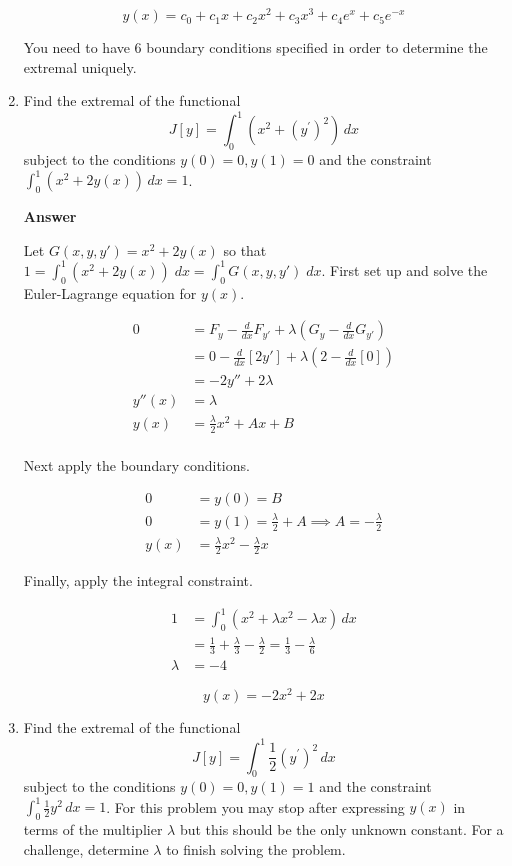 \documentclass[12pt]{article}
\begin{document}
\begin{enumerate}
$$\boxed{ y(x) = c_0 + c_1x +c_2x^2 + c_3x^3 + c_4e^x + c_5e^{-x}}$$

You need to have 6 boundary conditions specified in order to determine the extremal uniquely.

\newpage

\item Find the extremal of the functional
$$
J[y] = \int_0^1 \left( x^2 + (y^{\prime})^2 \right) \,dx
$$
subject to the conditions $y(0) = 0, y(1) = 0$ and the constraint $\int_0^1 \left( x^2 + 2 y(x) \right)\,dx = 1$.

{\bf Answer}

Let $G(x,y,y') = x^2 + 2y(x)$ so that $1 = \int_0^1 \left( x^2 +2y(x)\right) \; dx = \int_0^1 G(x,y,y') \; dx$. First set up and solve the Euler-Lagrange equation for $y(x)$. 

\begin{align*}
0 &= F_y - \frac{d}{dx}F_{y'} + \lambda (G_y - \frac{d}{dx}G_{y'}) \\
&= 0 - \frac{d}{dx}[2y'] + \lambda (2 - \frac{d}{dx}[0]) \\
&= -2y''  + 2\lambda \\
y''(x) &= \lambda \\
y(x) &= \frac{\lambda}{2}x^2 + Ax + B \\
\end{align*}

Next apply the boundary conditions.

\begin{align*}
0 &= y(0) = B \\
0 &= y(1) = \frac{\lambda}{2} + A \implies A = -\frac{\lambda}{2} \\
y(x) &= \frac{\lambda}{2}x^2 - \frac{\lambda}{2}x
\end{align*}

Finally, apply the integral constraint.

\begin{align*}
1 &= \int_0^1 \left(x^2 + \lambda x^2 - \lambda x \right) \, dx \\
&= \frac{1}{3} + \frac{\lambda}{3} - \frac{\lambda}{2} = \frac{1}{3} -\frac{\lambda}{6} \\
\lambda &= -4
\end{align*}

$$\boxed{ y(x) = -2x^2+2x } $$

\newpage

\item Find the extremal of the functional
$$
J[y] = \int_0^1 \frac{1}{2} (y^{\prime})^2 \,dx
$$
subject to the conditions $y(0) = 0, y(1) = 1$ and the constraint $\int_0^1 \frac{1}{2}y^2 \,dx = 1$. For this problem   you may stop after expressing $y(x)$ in terms of the multiplier $\lambda$ but this should be the only unknown constant. For a challenge, determine $\lambda$ to finish solving the problem.


\end{enumerate}
\end{document}
